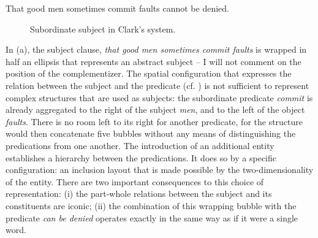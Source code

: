 \documentclass[english,output=paper,colorlinks,citecolor=brown]{../langscibook}
\begin{document}
\ea \label{ex:4:4} That good men sometimes commit faults cannot be denied. \z

\begin{figure}
    \caption{Subordinate subject in Clark's system.\label{fig:4:9}}
\end{figure}
 

In (a), the subject clause, \textit{that good men sometimes commit faults} is wrapped in half an ellipsis that represents an abstract subject – I will not comment on the position of the complementizer. The spatial configuration that expresses the relation between the subject and the predicate (cf. ) is not sufficient to represent complex structures that are used as subjects: the subordinate predicate \textit{commit} is already aggregated to the right of the subject \textit{men}, and to the left of the object \textit{faults}. There is no room left to its right for another predicate, for the structure would then concatenate five bubbles without any means of distinguishing the predications from one another. The introduction of an additional entity establishes a hierarchy between the predications. It does so by a specific configuration: an inclusion layout that is made possible by the two-dimensionality of the entity. There are two important consequences to this choice of representation: (i) the part-whole relations between the subject and its constituents are iconic; (ii) the combination of this wrapping bubble with the predicate \textit{can be denied} operates exactly in the same way as if it were a single word.
\end{document}
